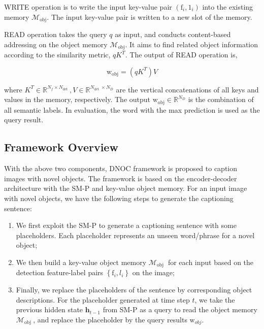 \documentclass[a4paper, 11pt]{article} %
\begin{document}
WRITE operation is to write the input key-value pair $\left(\mathrm{f}_{i}, 1_{i}\right)$
into the existing memory $\mathcal{M}_{\mathrm{obj}}$. The input key-value pair is written
to a new slot of the memory.

READ operation takes the query $q$ as input, and conducts content-based addressing on the
object memory $\mathcal{M}_{\text {obj}}$. It aims to find related object information
according to the similarity metric, $q K^{T}$. The output of READ operation is,

$$
	\mathrm{w}_{\mathrm{obj}}=\left(q K^{T}\right) V
$$

where $K^{T} \in \mathbb{R}^{N_{f} \times N_{\text {det }}}, V \in \mathbb{R}^{N_{\text {det }} \times N_{D}}$
are the vertical concatenations of all keys and values in the memory, respectively. The output
$\mathrm{w}_{\mathrm{obj}} \in \mathbb{R}^{N_{D}}$ is the combination of all semantic labels.
In evaluation, the word with the max prediction is used as the query result.

\subsection{\textbf{Framework Overview}}

With the above two components, DNOC framework is proposed to caption images with novel
objects. The framework is based on the encoder-decoder architecture with the SM-P and
key-value object memory. For an input image with novel objects, we have the following
steps to generate the captioning sentence:

\begin{enumerate}
	\item We first exploit the SM-P to generate a captioning sentence with some placeholders.
	      Each placeholder represents an unseen word/phrase for a novel object;
	\item We then build a key-value object memory $\mathcal{M}_{\text {obj }}$ for each input
	      based on the detection feature-label pairs $\left\{\mathrm{f}_{i}, l_{i}\right\}$ on
	      the image;
	\item Finally, we replace the placeholders of the sentence by corresponding object
	      descriptions. For the placeholder generated at time step $t$, we take the previous
	      hidden state $\mathbf{h}_{t-1}$ from SM-P as a query to read the object memory
	      $\mathcal{M}_{\text {obj }}$, and replace the placeholder by the query results
	      $\mathrm{w}_{o b j}$.
\end{enumerate}
\end{document}
